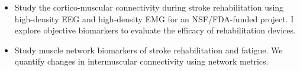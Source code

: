 \documentclass[10pt,letter,ragged2e]{altacv}
\begin{document}

\begin{fullwidth}
\makecvheader
\end{fullwidth}



\begin{itemize}
\item Study the cortico-muscular connectivity during stroke rehabilitation using high-density EEG and high-density EMG for an NSF/FDA-funded project. I explore objective biomarkers to evaluate the efficacy of rehabilitation devices.
\smallskip
\item Study muscle network biomarkers of stroke rehabilitation and fatigue. We quantify changes in intermuscular connectivity using network metrics.
\end{itemize}

\divider
\end{document}
